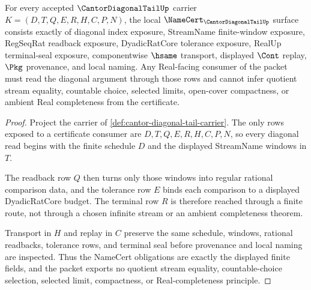 \begin{theorem}
\label{thm:cantor-diagonal-tail-namecert-obligations}
For every accepted $\CantorDiagonalTailUp$ carrier $K=(D,T,Q,E,R,H,C,P,N)$, the local $\NameCert_{\CantorDiagonalTailUp}$ surface consists exactly of diagonal index exposure, StreamName finite-window exposure, RegSeqRat readback exposure, DyadicRatCore tolerance exposure, RealUp terminal-seal exposure, componentwise $\hsame$ transport, displayed $\Cont$ replay, $\Pkg$ provenance, and local naming. Any Real-facing consumer of the packet must read the diagonal argument through those rows and cannot infer quotient stream equality, countable choice, selected limits, open-cover compactness, or ambient Real completeness from the certificate.
\end{theorem}
\begin{proof}
Project the carrier of \autoref{def:cantor-diagonal-tail-carrier}. The only rows exposed to a certificate consumer are $D,T,Q,E,R,H,C,P,N$, so every diagonal read begins with the finite schedule $D$ and the displayed StreamName windows in $T$.

The readback row $Q$ then turns only those windows into regular rational comparison data, and the tolerance row $E$ binds each comparison to a displayed DyadicRatCore budget. The terminal row $R$ is therefore reached through a finite route, not through a chosen infinite stream or an ambient completeness theorem.

Transport in $H$ and replay in $C$ preserve the same schedule, windows, rational readbacks, tolerance rows, and terminal seal before provenance and local naming are inspected. Thus the NameCert obligations are exactly the displayed finite fields, and the packet exports no quotient stream equality, countable-choice selection, selected limit, compactness, or Real-completeness principle.
\end{proof}

